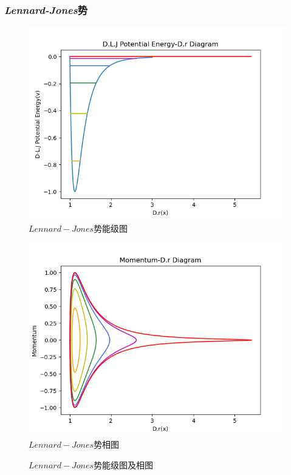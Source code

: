 \documentclass[11pt, a4paper, oneside]{ctexart}
\begin{document}
{{{\begin{appendices}
    \subsubsection{\emph{Lennard-Jones}势}
    {
        \begin{figure}[!ht]
            \caption{ $Lennard-Jones$势能级图}
            \centering
            \includegraphics[scale=0.75]{h21.png}
        \end{figure} 
        \begin{figure}[!ht]
            \caption{ $Lennard-Jones$势相图}
	
            \centering
            \includegraphics[scale=0.75]{h22.png}
        \end{figure} 
        \begin{figure}[!ht]
            \caption{ $Lennard-Jones$势能级图及相图}
	

\end{figure}}
\end{appendices}}}}
\end{document}
